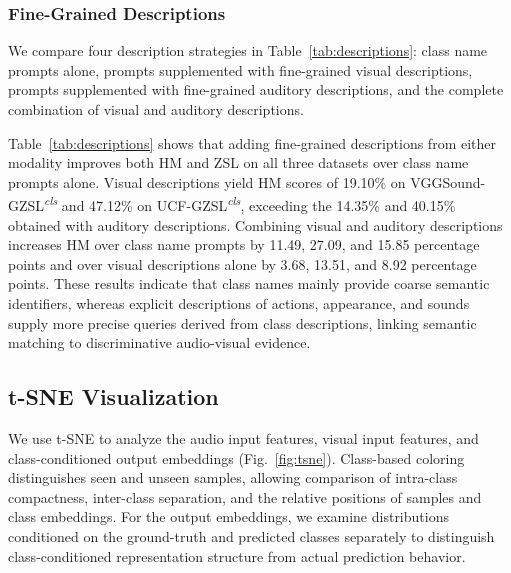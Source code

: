 \subsubsection{Fine-Grained Descriptions}\label{sec:fine-grained-descriptions}

We compare four description strategies in Table~\ref{tab:descriptions}: class name prompts alone, prompts supplemented with fine-grained visual descriptions, prompts supplemented with fine-grained auditory descriptions, and the complete combination of visual and auditory descriptions.



Table~\ref{tab:descriptions} shows that adding fine-grained descriptions from either modality improves both HM and ZSL on all three datasets over class name prompts alone. Visual descriptions yield HM scores of 19.10\% on VGGSound-GZSL\textsuperscript{\textit{cls}} and 47.12\% on UCF-GZSL\textsuperscript{\textit{cls}}, exceeding the 14.35\% and 40.15\% obtained with auditory descriptions. Combining visual and auditory descriptions increases HM over class name prompts by 11.49, 27.09, and 15.85 percentage points and over visual descriptions alone by 3.68, 13.51, and 8.92 percentage points. These results indicate that class names mainly provide coarse semantic identifiers, whereas explicit descriptions of actions, appearance, and sounds supply more precise queries derived from class descriptions, linking semantic matching to discriminative audio-visual evidence.

\subsection{t-SNE Visualization}\label{sec:t-sne-visualization}

We use t-SNE \cite{maaten2008tsne} to analyze the audio input features, visual input features, and class-conditioned output embeddings (Fig.~\ref{fig:tsne}). Class-based coloring distinguishes seen and unseen samples, allowing comparison of intra-class compactness, inter-class separation, and the relative positions of samples and class embeddings. For the output embeddings, we examine distributions conditioned on the ground-truth and predicted classes separately to distinguish class-conditioned representation structure from actual prediction behavior.

